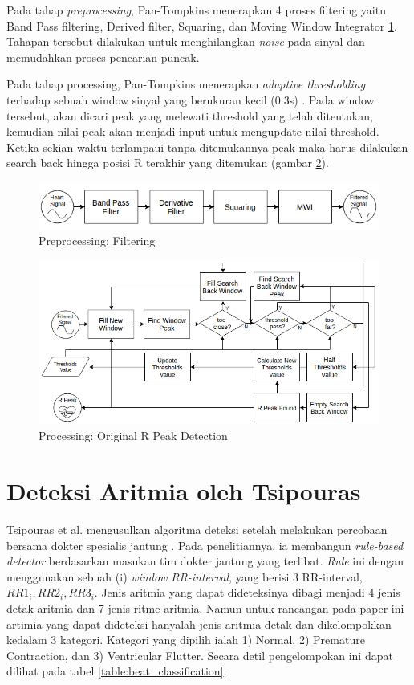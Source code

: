 Pada tahap \textit{preprocessing}, Pan-Tompkins menerapkan 4 proses filtering yaitu Band Pass filtering, Derived filter, Squaring, dan Moving Window Integrator \ref{fig:preprocessing}. Tahapan tersebut dilakukan untuk menghilangkan \textit{noise} pada sinyal dan memudahkan proses pencarian puncak. 

Pada tahap processing, Pan-Tompkins menerapkan \textit{adaptive thresholding} terhadap sebuah window sinyal yang berukuran kecil (0.3s) \cite{pantom}. Pada window tersebut, akan dicari peak yang melewati threshold yang telah ditentukan, kemudian nilai peak akan menjadi input untuk  mengupdate nilai threshold. Ketika sekian waktu terlampaui tanpa ditemukannya peak maka harus dilakukan search back hingga posisi R terakhir yang ditemukan (gambar \ref{fig:processing_ori}).

\begin{figure}[htbp]
\centerline{\includegraphics[scale=0.65]{images/preprocessing.png}}
\caption{Preprocessing: Filtering}
\label{fig:preprocessing}
\end{figure}

\begin{figure}[htbp]
\centerline{\includegraphics[scale=0.6]{images/processing_ori.png}}
\caption{Processing: Original R Peak Detection}
\label{fig:processing_ori}
\end{figure}

\section{Deteksi Aritmia oleh Tsipouras}\label{bab2_tsipouras}
Tsipouras et al. mengusulkan algoritma deteksi setelah melakukan percobaan bersama dokter spesialis jantung \cite{tsipouras}. Pada penelitiannya, ia membangun \textit{rule-based detector} berdasarkan masukan tim dokter jantung yang terlibat. \textit{Rule} ini dengan menggunakan sebuah (i) \textit{window RR-interval}, yang berisi 3 RR-interval, $RR1_i, RR2_i, RR3_i$. Jenis aritmia yang dapat dideteksinya dibagi menjadi 4 jenis detak aritmia dan 7 jenis ritme aritmia. Namun untuk rancangan pada paper ini artimia yang dapat dideteksi hanyalah jenis aritmia detak dan dikelompokkan kedalam 3 kategori. Kategori yang dipilih ialah 1) Normal, 2) Premature Contraction, dan 3) Ventricular Flutter. Secara detil pengelompokan ini dapat dilihat pada tabel \ref{table:beat_classification}.

